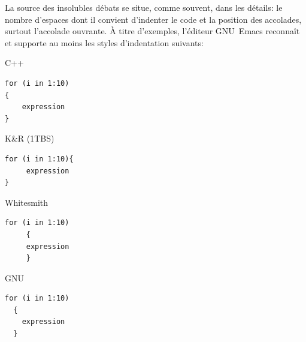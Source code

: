 
La source des insolubles débats se situe, comme souvent, dans les
détails: le nombre d'espaces dont il convient d'indenter le code et la
position des accolades, surtout l'accolade ouvrante. À titre
d'exemples, l'éditeur GNU~Emacs reconnaît et supporte au
moins les styles d'indentation suivants:

\vspace{\topsep}\noindent
\begin{minipage}{\linewidth}
  \begin{minipage}[t]{0.48\linewidth}
    C++
    \begin{Schunk}
\begin{Verbatim}
for (i in 1:10)
{
    expression
}
\end{Verbatim}
    \end{Schunk}
  \end{minipage}
  \hfill
  \begin{minipage}[t]{0.48\linewidth}
    K\&R (1TBS\footnotemark)
    \begin{Schunk}
\begin{Verbatim}
for (i in 1:10){
     expression
}
\end{Verbatim}
    \end{Schunk}
  \end{minipage}
\end{minipage}

\vspace{\topsep}\noindent
\begin{minipage}{\linewidth}
  \begin{minipage}[t]{0.48\linewidth}
    Whitesmith
    \begin{Schunk}
\begin{Verbatim}
for (i in 1:10)
     {
     expression
     }
\end{Verbatim}
    \end{Schunk}
  \end{minipage}
  \hfill
  \begin{minipage}[t]{0.48\linewidth}
    GNU
    \begin{Schunk}
\begin{Verbatim}
for (i in 1:10)
  {
    expression
  }
\end{Verbatim}
    \end{Schunk}
  \end{minipage}
\end{minipage}
\vspace{\topsep}

